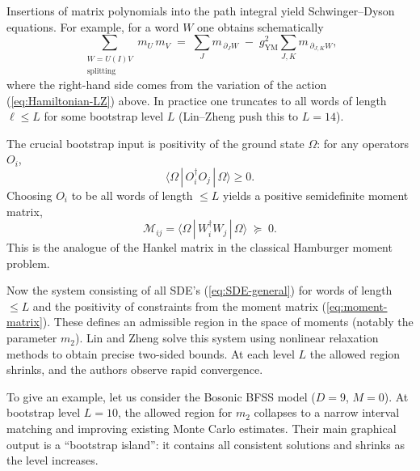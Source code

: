 \documentclass[11pt]{article}
\theoremstyle{plain}
\begin{document}
\noindent

Insertions of matrix polynomials into the path integral yield
Schwinger--Dyson equations.  For example, for a word $W$ one obtains
schematically
\begin{equation}
\sum_{\substack{W = U(I)V \\ \text{splitting}}}
m_{U}\,m_{V}
\;=\;
\sum_{J} m_{\,\partial_J W}
\;-\;
g_{\mathrm{YM}}^2 
\sum_{J,K} m_{\,\partial_{J,K} W},
\label{eq:SDE-general}
\end{equation}
where the right-hand side comes from the variation of the action
(\ref{eq:Hamiltonian-LZ}) above.  In practice one truncates to all words of
length $\ell \le L$ for some bootstrap level $L$ (Lin--Zheng push this to
$L=14$).

\medskip

\noindent

The crucial bootstrap input is positivity of the ground state $\Omega$:
for any operators $O_i$,
\[
\langle \Omega \,|\, O_i^\dagger O_j \,|\, \Omega\rangle \ge 0.
\]
Choosing $O_i$ to be all words of length $\le L$ yields a positive
semidefinite moment matrix,
\begin{equation}
\mathcal{M}_{ij}
=
\langle \Omega \,|\, W_i^\dagger W_j \,|\, \Omega\rangle
\;\succeq\; 0.
\label{eq:moment-matrix}
\end{equation}
This is the analogue of the Hankel matrix in the classical Hamburger
moment problem.

\medskip

\noindent

Now the system consisting of
all SDE's (\ref{eq:SDE-general}) for words of length
$\le L$ and the
positivity of constraints from the moment matrix (\ref{eq:moment-matrix}). These 
defines an admissible region in the space of moments (notably the
parameter $m_2$).  
Lin and Zheng solve this system using nonlinear relaxation methods to
obtain precise two-sided bounds.  At each level $L$ the allowed region
shrinks, and the authors observe rapid convergence.

\medskip

\noindent
To give an example, let us consider the  Bosonic BFSS  model ($D=9$, $M=0$).
At bootstrap level $L=10$, the allowed region for $m_2$ collapses to a
narrow interval matching and improving existing Monte Carlo estimates.
Their main graphical output is a ``bootstrap island'':
it contains all consistent solutions and shrinks as the level increases.


\medskip
\end{document}
